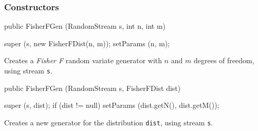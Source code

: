 \subsubsection* {Constructors}
\begin{code}

   public FisherFGen (RandomStream s, int n, int m) \begin{hide} {
      super (s, new FisherFDist(n, m));
      setParams (n, m);
      }\end{hide}
\end{code} 
\begin{tabb}  Creates a \emph{Fisher F} random variate generator with 
 $n$ and $m$ degrees of freedom, using stream \texttt{s}. 
\end{tabb}
\begin{code}

   public FisherFGen (RandomStream s, FisherFDist dist) \begin{hide} {
      super (s, dist);
      if (dist != null)
         setParams (dist.getN(), dist.getM());
   }\end{hide}
\end{code}
  \begin{tabb} Creates a new generator for the distribution \texttt{dist},
     using stream \texttt{s}.
  \end{tabb}

